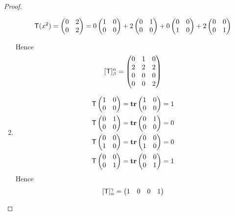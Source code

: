 \begin{proof}
\begin{enumerate}
\begin{align*}
    \textsf{T}(x^2) = \begin{pmatrix} 0 & 2 \\ 0 & 2 \end{pmatrix}
          = 0 \begin{pmatrix} 1 & 0 \\ 0 & 0 \end{pmatrix}
          + 2 \begin{pmatrix} 0 & 1 \\ 0 & 0 \end{pmatrix}
          + 0 \begin{pmatrix} 0 & 0 \\ 1 & 0 \end{pmatrix}
          + 2 \begin{pmatrix} 0 & 0 \\ 0 & 1 \end{pmatrix} \\
\end{align*}

Hence
\[
    [\textsf{T}]_{\beta}^{\alpha}
    = \begin{pmatrix} 0 & 1 & 0 \\ 2 & 2 & 2 \\ 0 & 0 & 0 \\ 0 & 0 & 2 \end{pmatrix}
\]

\item
\begin{align*}
    \textsf{T} \begin{pmatrix} 1 & 0 \\ 0 & 0 \end{pmatrix}
        = \textbf{tr} \begin{pmatrix} 1 & 0 \\ 0 & 0 \end{pmatrix} = 1 \\
    \textsf{T} \begin{pmatrix} 0 & 1 \\ 0 & 0 \end{pmatrix}
        = \textbf{tr} \begin{pmatrix} 0 & 1 \\ 0 & 0 \end{pmatrix} = 0 \\
    \textsf{T} \begin{pmatrix} 0 & 0 \\ 1 & 0 \end{pmatrix}
        = \textbf{tr} \begin{pmatrix} 0 & 0 \\ 1 & 0 \end{pmatrix} = 0 \\
    \textsf{T} \begin{pmatrix} 0 & 0 \\ 0 & 1 \end{pmatrix}
        = \textbf{tr} \begin{pmatrix} 0 & 0 \\ 0 & 1 \end{pmatrix} = 1
\end{align*}
Hence
\[
    [\textsf{T}]_{\alpha}^{\gamma} = \begin{pmatrix} 1 & 0 & 0 & 1 \end{pmatrix}
\]


\end{enumerate}
\end{proof}
